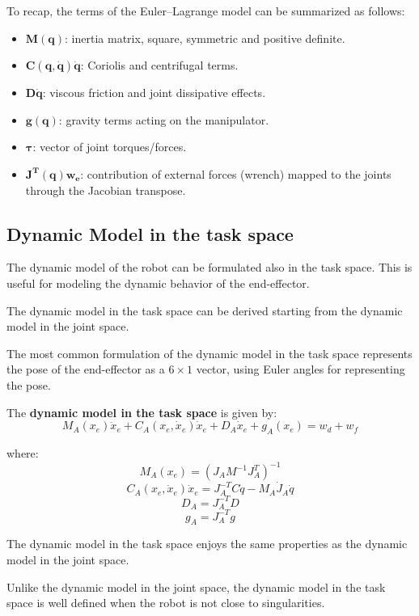 \hfill

To recap, the terms of the Euler--Lagrange model can be summarized as follows:

\begin{itemize}
    \item $\mathbf{M(q)}$: inertia matrix, square, symmetric and positive definite.
    \item $\mathbf{C(q,\dot{q})\dot{q}}$: Coriolis and centrifugal terms.
    \item $\mathbf{D\dot{q}}$: viscous friction and joint dissipative effects.
    \item $\mathbf{g(q)}$: gravity terms acting on the manipulator.
    \item $\mathbf{\tau}$: vector of joint torques/forces.
    \item $\mathbf{J^T(q)w_e}$: contribution of external forces (wrench) mapped to the joints through the Jacobian transpose.
\end{itemize}

\hfill

\subsection{Dynamic Model in the task space}

The dynamic model of the robot can be formulated also in the task space. This is useful for modeling the dynamic behavior of the end-effector.  

The dynamic model in the task space can be derived starting from the dynamic model in the joint space.  

The most common formulation of the dynamic model in the task space represents the pose of the end-effector as a $6 \times 1$ vector, using Euler angles for representing the pose.

The \textbf{dynamic model in the task space} is given by:
\[
    M_A(x_e)\ddot{x}_e + C_A(x_e, \dot{x}_e)\dot{x}_e + D_A\dot{x}_e + g_A(x_e) = w_d + w_f
\]

where:
\[
    M_A(x_e) = \left(J_A M^{-1} J_A^T \right)^{-1}
\]
\[
    C_A(x_e, \dot{x}_e)\dot{x}_e = J_A^{-T} C \dot{q} - M_A \dot{J}_A \dot{q}
\]
\[
    D_A = J_A^{-T} D
\]
\[
    g_A = J_A^{-T} g
\]

\hfill

The dynamic model in the task space enjoys the same properties as the dynamic model in the joint space.  

Unlike the dynamic model in the joint space, the dynamic model in the task space is well defined when the robot is not close to singularities.  

\newpage
